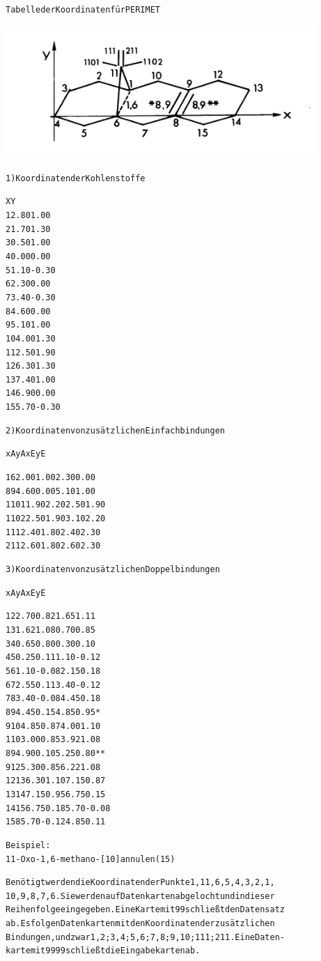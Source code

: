 \documentclass[a4paper,11pt]{article}
\begin{document}
\begin{alltt}
Tabelle der Koordinaten für PERIMET

\noindent\includegraphics[width=11.77cm]{PERIMET_Annulene}

1) Koordinaten der Kohlenstoffe

          X    Y
       1 2.80 1.00
       2 1.70 1.30
       3 0.50 1.00
       4 0.00 0.00
       5 1.10-0.30
       6 2.30 0.00
       7 3.40-0.30
       8 4.60 0.00
       9 5.10 1.00
      10 4.00 1.30
      11 2.50 1.90
      12 6.30 1.30
      13 7.40 1.00
      14 6.90 0.00
      15 5.70-0.30

2) Koordinaten von zusätzlichen Einfachbindungen

          xA   yA   xE   yE

     1 6 2.00 1.00 2.30 0.00
     8 9 4.60 0.00 5.10 1.00
    1101 1.90 2.20 2.50 1.90
    1102 2.50 1.90 3.10 2.20
     111 2.40 1.80 2.40 2.30
     211 2.60 1.80 2.60 2.30
\newpage
{}


3) Koordinaten von zusätzlichen Doppelbindungen

          xA   yA   xE   yE

     1 2 2.70 0.82 1.65 1.11
     1 3 1.62 1.08 0.70 0.85
     3 4 0.65 0.80 0.30 0.10
     4 5 0.25 0.11 1.10-0.12
     5 6 1.10-0.08 2.15 0.18
     6 7 2.55 0.11 3.40-0.12
     7 8 3.40-0.08 4.45 0.18
     8 9 4.45 0.15 4.85 0.95 *
     910 4.85 0.87 4.00 1.10
     110 3.00 0.85 3.92 1.08
     8 9 4.90 0.10 5.25 0.80 **
     912 5.30 0.85 6.22 1.08
    1213 6.30 1.10 7.15 0.87
    1314 7.15 0.95 6.75 0.15
    1415 6.75 0.18 5.70-0.08
    15 8 5.70-0.12 4.85 0.11

Beispiel:
11-Oxo-1,6-methano-[10]annulen (15)

Benötigt werden die Koordinaten der Punkte 1, 11, 6, 5, 4, 3, 2, 1,
10, 9, 8, 7, 6. Sie werden auf Datenkarten abgelocht und in dieser
Reihenfolge eingegeben. Eine Karte mit 99 schließt den Datensatz
ab. Es folgen Datenkarten mit den Koordinaten der zusätzlichen
Bindungen, und zwar 1,2; 3,4; 5,6; 7,8; 9,10; 111; 211. Eine Daten-
karte mit 9999 schließt die Eingabekarten ab.
\newpage
{}


\end{alltt}
\end{document}

